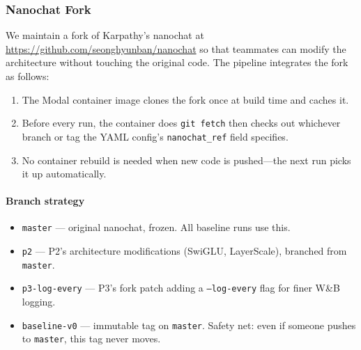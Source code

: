 \subsubsection{Nanochat Fork}

We maintain a fork of Karpathy's nanochat at \url{https://github.com/seonghyunban/nanochat} so that teammates can modify the architecture without touching the original code. The pipeline integrates the fork as follows:

\begin{enumerate}[nosep]
  \item The Modal container image clones the fork once at build time and caches it.
  \item Before every run, the container does \texttt{git fetch} then checks out whichever branch or tag the YAML config's \texttt{nanochat\_ref} field specifies.
  \item No container rebuild is needed when new code is pushed---the next run picks it up automatically.
\end{enumerate}

\paragraph{Branch strategy}

\begin{itemize}[nosep]
  \item \texttt{master} --- original nanochat, frozen. All baseline runs use this.
  \item \texttt{p2} --- P2's architecture modifications (SwiGLU, LayerScale), branched from \texttt{master}.
  \item \texttt{p3-log-every} --- P3's fork patch adding a \texttt{--log-every} flag for finer W\&B logging.
  \item \texttt{baseline-v0} --- immutable tag on \texttt{master}. Safety net: even if someone pushes to \texttt{master}, this tag never moves.
\end{itemize}
